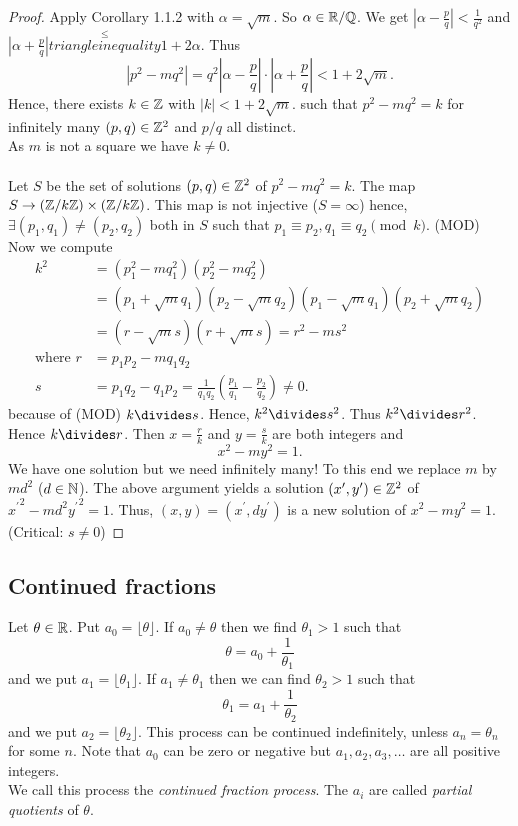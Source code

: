 \documentclass[NumTh.tex]{subfiles}
\begin{document}
\begin{proof}
  Apply Corollary 1.1.2 with $\alpha = \sqrt{m}$. So $\alpha \in \mathbb{R}/\mathbb{Q}$.
  We get $| \alpha - \frac{p}{q} | < \frac{1}{q^2}$ and $|\alpha + \frac{p}{q} | \overset{\leq}{triangle inequality} 1 + 2 \alpha$.
  Thus
  \[ |p^2 - mq^2| = q^2 | \alpha - \frac{p}{q} | \cdot |\alpha + \frac{p}{q}| < 1 + 2 \sqrt{m}. \]
  Hence, there exists $k \in \mathbb{Z}$ with $|k| < 1 + 2 \sqrt{m}$. such that $ p^2 - m q^2 = k$ for infinitely many $(p,q) \in \mathbb{Z}^2$ and $p/q$ all distinct.\\
  As $m$ is not a square we have $k \neq 0$.\\
  \\
  Let $S$ be the set of solutions $(p,q) \in \mathbb{Z}^2$ of $p^2 - m q^2 = k$.
  The map $S \to (\mathbb{Z}/k\mathbb{Z}) \times (\mathbb{Z}/k\mathbb{Z})$.
  This map is not injective ($S = \infty$) hence, $\exists (p_1,q_1) \neq (p_2,q_2)$ both in $S$ such that $p_1 \equiv p_2, q_1 \equiv q_2 \pmod k$. (MOD)\\%
  Now we compute
  \begin{align}
    k^2 &= (p_1^2 - m q_1^2)(p_2^2 - m q_2^2)\\
    &= (p_1 + \sqrt{m}q_1)(p_2 - \sqrt{m} q_2)(p_1 - \sqrt{m}q_1)(p_2 + \sqrt{m} q_2)\\
    &= (r - \sqrt{m} s)( r + \sqrt{m} s) = r^2 - m s^2\\
    \text{where } r &= p_1 p_2 - m q_1 q_2\\
    s &= p_1 q_2 - q_1 p_2 = \frac{1}{q_1 q_2} (\frac{p_1}{q_1} - \frac{p_2}{q_2}) \neq 0.
  \end{align}
  because of (MOD) $k \divides s$. Hence, $k^2 \divides s^2$. Thus $k^2 \divides r^2$. Hence $k \divides r$.
  Then $ x = \frac{r}{k}$ and $y = \frac{s}{k}$ are both integers and
  \[x^2 - m y^2 = 1. \]
  We have one solution but we need infinitely many! To this end we replace $m$ by $md^2$ ($d \in \mathbb{N}$).
  The above argument yields a solution $(x^\prime,y^\prime) \in \mathbb{Z}^2$ of ${x^\prime}^2 - md^2 {y^\prime}^2 = 1$.
  Thus, $(x,y) = (x^\prime,dy^\prime)$ is a new solution of $x^2 - m y^2 = 1$.\\
  (Critical: $s \neq 0$)
\end{proof}

\subsection{Continued fractions}

Let $\theta \in \mathbb{R}$. Put $a_0 = \lfloor \theta \rfloor$. If $a_0 \neq \theta$ then we find $\theta_1 > 1$ such that
\[ \theta = a_0 + \frac{1}{\theta_1} \]
and we put $a_1 = \lfloor \theta_1 \rfloor$. If $a_1 \neq \theta_1$ then we can find $\theta_2 > 1$ such that
\[ \theta_1 = a_1 + \frac{1}{\theta_2} \]
and we put $a_2 = \lfloor \theta_2 \rfloor$. This process can be continued indefinitely, unless $a_n = \theta_n$ for some $n$.
Note that $a_0$ can be zero or negative but  $a_1,a_2, a_3, \dots$ are all positive integers.\\
We call this process the \emph{continued fraction process}. The $a_i$ are called \emph{partial quotients} of $\theta$.
\end{document}

